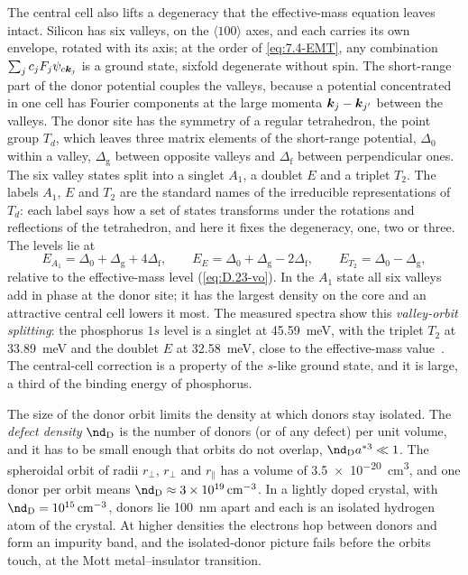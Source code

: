 The central cell also lifts a degeneracy that the effective-mass equation leaves intact. Silicon has six valleys, on the $\langle100\rangle$ axes, and each carries its own envelope, rotated with its axis; at the order of \cref{eq:7.4-EMT}, any combination $\sum_jc_jF_j\psi_{c\bm{k}_j}$ is a ground state, sixfold degenerate without spin. The short-range part of the donor potential couples the valleys, because a potential concentrated in one cell has Fourier components at the large momenta $\bm{k}_j - \bm{k}_{j'}$ between the valleys. The donor site has the symmetry of a regular tetrahedron, the point group $T_d$, which leaves three matrix elements of the short-range potential, $\Delta_0$ within a valley, $\Delta_{\mathrm{g}}$ between opposite valleys and $\Delta_{\mathrm{f}}$ between perpendicular ones. The six valley states split into a singlet $A_1$, a doublet $E$ and a triplet $T_2$. The labels $A_1$, $E$ and $T_2$ are the standard names of the irreducible representations of $T_d$: each label says how a set of states transforms under the rotations and reflections of the tetrahedron, and here it fixes the degeneracy, one, two or three. The levels lie at
\begin{equation}
  E_{A_1} = \Delta_0 + \Delta_{\mathrm{g}} + 4\Delta_{\mathrm{f}} , \qquad
  E_E = \Delta_0 + \Delta_{\mathrm{g}} - 2\Delta_{\mathrm{f}} , \qquad
  E_{T_2} = \Delta_0 - \Delta_{\mathrm{g}} ,
  \label{eq:7.4-vo}
\end{equation}
relative to the effective-mass level (\cref{eq:D.23-vo}). In the $A_1$ state all six valleys add in phase at the donor site; it has the largest density on the core and an attractive central cell lowers it most. The measured spectra show this \emph{valley-orbit splitting}: the phosphorus $1s$ level is a singlet at \SI{45.59}{meV}, with the triplet $T_2$ at \SI{33.89}{meV} and the doublet $E$ at \SI{32.58}{meV}, close to the effective-mass value~\cite[Fig.~1]{vinh2008silicon}. The central-cell correction is a property of the $s$-like ground state, and it is large, a third of the binding energy of phosphorus.

The size of the donor orbit limits the density at which donors stay isolated. The \emph{defect density} $\nd_{\mathrm{D}}$ is the number of donors (or of any defect) per unit volume, and it has to be small enough that orbits do not overlap, $\nd_{\mathrm{D}}a^{*3} \ll 1$. The spheroidal orbit of radii $r_\perp$, $r_\perp$ and $r_\parallel$ has a volume of \SI{3.5e-20}{cm^3}, and one donor per orbit means $\nd_{\mathrm{D}} \approx \SI{3e19}{cm^{-3}}$. In a lightly doped crystal, with $\nd_{\mathrm{D}} = \SI{e15}{cm^{-3}}$, donors lie \SI{100}{nm} apart and each is an isolated hydrogen atom of the crystal. At higher densities the electrons hop between donors and form an impurity band, and the isolated-donor picture fails before the orbits touch, at the Mott metal--insulator transition.


